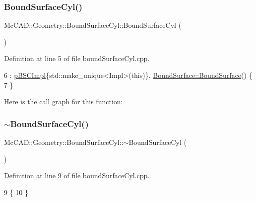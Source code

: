\subsubsection{\texorpdfstring{Bound\+Surface\+Cyl()}{BoundSurfaceCyl()}\hspace{0.1cm}{\footnotesize\ttfamily [1/2]}}
{\footnotesize\ttfamily Mc\+C\+A\+D\+::\+Geometry\+::\+Bound\+Surface\+Cyl\+::\+Bound\+Surface\+Cyl (\begin{DoxyParamCaption}{ }\end{DoxyParamCaption})}



Definition at line 5 of file bound\+Surface\+Cyl.\+cpp.


\begin{DoxyCode}
6   : \hyperlink{classMcCAD_1_1Geometry_1_1BoundSurfaceCyl_a01b2ad0ca6e49c27d8fd65e43e7a3cb9}{pBSCImpl}\{std::make\_unique<Impl>(\textcolor{keyword}{this})\}, \hyperlink{classMcCAD_1_1Geometry_1_1BoundSurface_a50af5d5cd7cc2a92400422f57988d137}{BoundSurface::BoundSurface}() 
      \{
7 \}
\end{DoxyCode}
Here is the call graph for this function\+:
\mbox{\label{classMcCAD_1_1Geometry_1_1BoundSurfaceCyl_a68fe26bd760aec66c95b254edd19b98f}} 
\subsubsection{\texorpdfstring{$\sim$\+Bound\+Surface\+Cyl()}{~BoundSurfaceCyl()}\hspace{0.1cm}{\footnotesize\ttfamily [1/2]}}
{\footnotesize\ttfamily Mc\+C\+A\+D\+::\+Geometry\+::\+Bound\+Surface\+Cyl\+::$\sim$\+Bound\+Surface\+Cyl (\begin{DoxyParamCaption}{ }\end{DoxyParamCaption})}



Definition at line 9 of file bound\+Surface\+Cyl.\+cpp.


\begin{DoxyCode}
9                                               \{
10 \}
\end{DoxyCode}
\mbox{\label{classMcCAD_1_1Geometry_1_1BoundSurfaceCyl_af24dcff5a5272064a23985d082e37d08}} 
